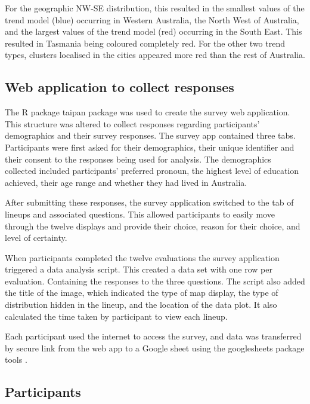 \documentclass[
doublespace,
  times]{anzsauth}
\begin{document}
For the geographic NW-SE distribution, this resulted in the smallest
values of the trend model (blue) occurring in Western Australia, the
North West of Australia, and the largest values of the trend model (red)
occurring in the South East. This resulted in Tasmania being coloured
completely red. For the other two trend types, clusters localised in the
cities appeared more red than the rest of Australia.

\subsection{Web application to collect
responses}\label{web-application-to-collect-responses}

The \textsf{R} package \textsf{taipan} \citep{taipan} package was used
to create the survey web application. This structure was altered to
collect responses regarding participants' demographics and their survey
responses. The survey app contained three tabs. Participants were first
asked for their demographics, their unique identifier and their consent
to the responses being used for analysis. The demographics collected
included participants' preferred pronoun, the highest level of education
achieved, their age range and whether they had lived in Australia.

After submitting these responses, the survey application switched to the
tab of lineups and associated questions. This allowed participants to
easily move through the twelve displays and provide their choice, reason
for their choice, and level of certainty.

When participants completed the twelve evaluations the survey
application triggered a data analysis script. This created a data set
with one row per evaluation. Containing the responses to the three
questions. The script also added the title of the image, which indicated
the type of map display, the type of distribution hidden in the lineup,
and the location of the data plot. It also calculated the time taken by
participant to view each lineup.

Each participant used the internet to access the survey, and data was
transferred by secure link from the web app to a Google sheet using the
\textsf{googlesheets} package tools \citep{sheets}.

\subsection{Participants}\label{participants}
\end{document}
